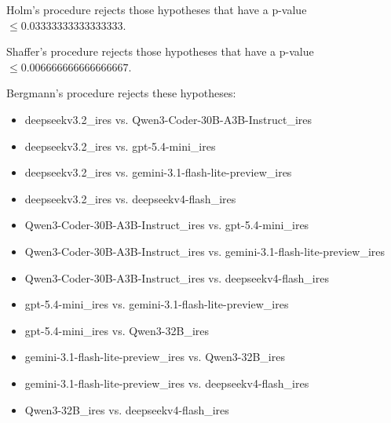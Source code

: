 \documentclass[a4paper,10pt]{article}
\begin{document}
\begin{landscape}
Holm's procedure rejects those hypotheses that have a p-value $\le0.03333333333333333$.


Shaffer's procedure rejects those hypotheses that have a p-value $\le0.006666666666666667$.


Bergmann's procedure rejects these hypotheses:


\begin{itemize}


\item deepseekv3.2_ires vs. Qwen3-Coder-30B-A3B-Instruct_ires
\item deepseekv3.2_ires vs. gpt-5.4-mini_ires
\item deepseekv3.2_ires vs. gemini-3.1-flash-lite-preview_ires
\item deepseekv3.2_ires vs. deepseekv4-flash_ires
\item Qwen3-Coder-30B-A3B-Instruct_ires vs. gpt-5.4-mini_ires
\item Qwen3-Coder-30B-A3B-Instruct_ires vs. gemini-3.1-flash-lite-preview_ires
\item Qwen3-Coder-30B-A3B-Instruct_ires vs. deepseekv4-flash_ires
\item gpt-5.4-mini_ires vs. gemini-3.1-flash-lite-preview_ires
\item gpt-5.4-mini_ires vs. Qwen3-32B_ires
\item gemini-3.1-flash-lite-preview_ires vs. Qwen3-32B_ires
\item gemini-3.1-flash-lite-preview_ires vs. deepseekv4-flash_ires
\item Qwen3-32B_ires vs. deepseekv4-flash_ires
\end{itemize}



\end{landscape}
\end{document}
